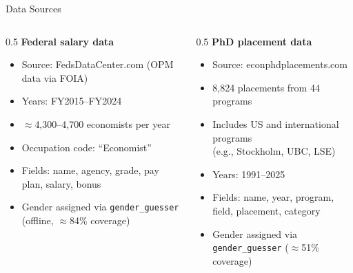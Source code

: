 \documentclass[aspectratio=169]{beamer}
\begin{document}
\begin{frame}{Data Sources}
  \begin{columns}
    \begin{column}{0.5\textwidth}
      \textbf{Federal salary data}\\[0.4em]
      \begin{itemize}
        \item Source: FedsDataCenter.com (OPM data via FOIA)
        \item Years: FY2015--FY2024
        \item $\approx$4,300--4,700 economists per year
        \item Occupation code: ``Economist''
        \item Fields: name, agency, grade, pay plan, salary, bonus
        \item Gender assigned via \texttt{gender\_guesser}
              (offline, $\approx$84\% coverage)
      \end{itemize}
    \end{column}
    \begin{column}{0.5\textwidth}
      \textbf{PhD placement data}\\[0.4em]
      \begin{itemize}
        \item Source: econphdplacements.com
        \item 8,824 placements from 44 programs
        \item Includes US and international programs\\
              (e.g., Stockholm, UBC, LSE)
        \item Years: 1991--2025
        \item Fields: name, year, program, field, placement, category
        \item Gender assigned via \texttt{gender\_guesser}
              ($\approx$51\% coverage)
      \end{itemize}
    \end{column}
  \end{columns}
\end{frame}
\end{document}
